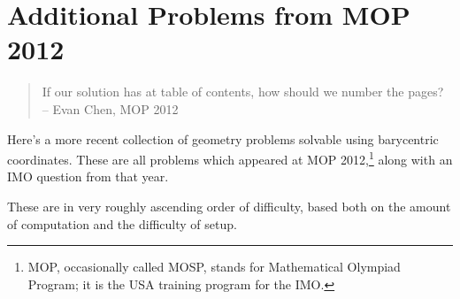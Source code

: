 \chapter{Additional Problems from MOP 2012}
\begin{quote}
  If our solution has at table of contents, how should we number the pages?
  \\ -- Evan Chen, MOP 2012
\end{quote}

Here's a more recent collection of geometry problems solvable using barycentric coordinates.  These are all problems which appeared at MOP 2012,\footnote{MOP, occasionally called MOSP, stands for Mathematical Olympiad Program; it is the USA training program for the IMO.} along with an IMO question from that year.

These are in very roughly ascending order of difficulty, based both on the amount of computation and the difficulty of setup.
